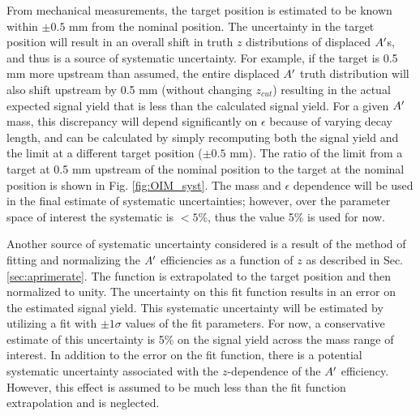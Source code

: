 From mechanical measurements, the target position is estimated to be known within $\pm 0.5$ mm from the nominal position. The uncertainty in the target position will result in an overall shift in truth $z$ distributions of displaced $A^\prime$s, and thus is a source of systematic uncertainty. For example, if the target is 0.5 mm more upstream than assumed, the entire displaced $A^\prime$ truth distribution will also shift upstream by 0.5 mm (without changing $z_{cut}$) resulting in the actual expected signal yield that is less than the calculated signal yield. For a given $A^\prime$ mass, this discrepancy will depend significantly on $\epsilon$ because of varying decay length, and can be calculated by simply recomputing both the signal yield and the limit at a different target position ($\pm 0.5$ mm). The ratio of the limit from a target at 0.5 mm upstream of the nominal position to the target at the nominal position is shown in Fig. \ref{fig:OIM_syst}. The mass and $\epsilon$ dependence will be used in the final estimate of systematic uncertainties; however, over the parameter space of interest the systematic is $<5$\%, thus the value 5\% is used for now.

Another source of systematic uncertainty considered is a result of the method of fitting and normalizing the $A^\prime$ efficiencies as a function of $z$ as described in Sec. \ref{sec:aprimerate}. The function is extrapolated to the target position and then normalized to unity. The uncertainty on this fit function results in an error on the estimated signal yield. This systematic uncertainty will be estimated by utilizing a fit with $\pm 1\sigma$ values of the fit parameters. For now, a conservative estimate of this uncertainty is 5\% on the signal yield across the mass range of interest. In addition to the error on the fit function, there is a potential systematic uncertainty associated with the $z$-dependence of the $A^\prime$ efficiency. However, this effect is assumed to be much less than the fit function extrapolation and is neglected.

